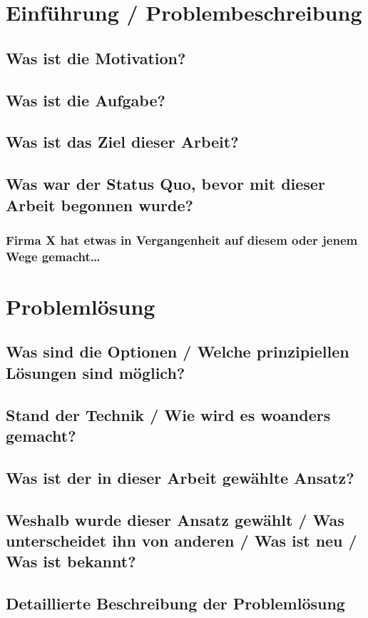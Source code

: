 
\section{Einführung / Problembeschreibung} 
\subsection{Was ist die Motivation?}
\subsection{Was ist die Aufgabe?}
\subsection{Was ist das Ziel dieser Arbeit?}
\subsection{Was war der Status Quo, bevor mit dieser Arbeit begonnen wurde?}
\subsubsection{Firma X hat etwas in Vergangenheit auf diesem oder jenem Wege gemacht…}
\section{Problemlösung}
\subsection{Was sind die Optionen / Welche prinzipiellen Lösungen sind möglich?}
\subsection{Stand der Technik / Wie wird es woanders gemacht?}
\subsection{Was ist der in dieser Arbeit gewählte Ansatz?}
\subsection{Weshalb wurde dieser Ansatz gewählt / Was unterscheidet ihn von anderen / Was ist neu / Was ist bekannt?}
\subsection{Detaillierte Beschreibung der Problemlösung}
